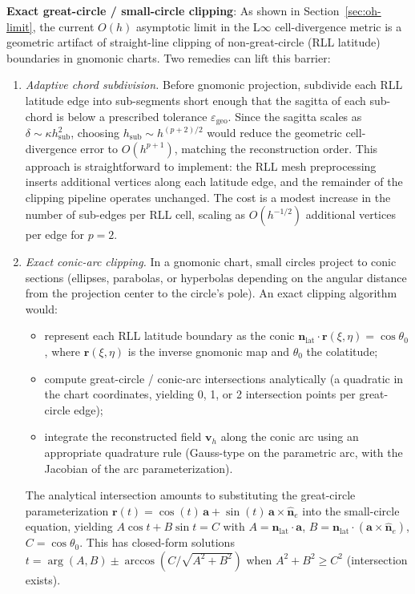 \documentclass[11pt]{article}
\begin{document}
\begin{itemize}
    \textbf{Exact great-circle / small-circle clipping}:
    As shown in Section~\ref{sec:oh-limit}, the current \(O(h)\) asymptotic
    limit in the L\(\infty\) cell-divergence metric is a geometric artifact of
    straight-line clipping of non-great-circle (RLL latitude) boundaries in
    gnomonic charts.  Two remedies can lift this barrier:
    \begin{enumerate}
      \item \emph{Adaptive chord subdivision.}  Before gnomonic projection,
      subdivide each RLL latitude edge into sub-segments short enough that the
      sagitta of each sub-chord is below a prescribed tolerance
      \(\varepsilon_{\mathrm{geo}}\).  Since the sagitta scales as
      \(\delta \sim \kappa h_{\mathrm{sub}}^2\), choosing
      \(h_{\mathrm{sub}} \sim h^{(p+2)/2}\) would reduce the geometric
      cell-divergence error to \(O(h^{p+1})\), matching the reconstruction
      order.  This approach is straightforward to implement: the RLL mesh
      preprocessing inserts additional vertices along each latitude edge, and
      the remainder of the clipping pipeline operates unchanged.  The cost is
      a modest increase in the number of sub-edges per RLL cell, scaling as
      \(O(h^{-1/2})\) additional vertices per edge for \(p=2\).

      \item \emph{Exact conic-arc clipping.}  In a gnomonic chart, small
      circles project to conic sections (ellipses, parabolas, or hyperbolas
      depending on the angular distance from the projection center to the
      circle's pole).  An exact clipping algorithm would:
      \begin{itemize}
        \item represent each RLL latitude boundary as the conic
          \(\mathbf{n}_{\mathrm{lat}} \cdot \mathbf{r}(\xi,\eta) = \cos\theta_0\),
          where \(\mathbf{r}(\xi,\eta)\) is the inverse gnomonic map and
          \(\theta_0\) the colatitude;
        \item compute great-circle / conic-arc intersections analytically
          (a quadratic in the chart coordinates, yielding 0, 1, or 2
          intersection points per great-circle edge);
        \item integrate the reconstructed field \(\mathbf{v}_h\) along the
          conic arc using an appropriate quadrature rule (Gauss-type on the
          parametric arc, with the Jacobian of the arc parameterization).
      \end{itemize}
      The analytical intersection amounts to substituting the great-circle
      parameterization \(\mathbf{r}(t) = \cos(t)\,\mathbf{a} + \sin(t)\,
      \mathbf{a}\times\hat{\mathbf{n}}_e\) into the small-circle equation,
      yielding \(A\cos t + B\sin t = C\) with \(A = \mathbf{n}_{\mathrm{lat}}
      \cdot \mathbf{a}\), \(B = \mathbf{n}_{\mathrm{lat}} \cdot
      (\mathbf{a}\times\hat{\mathbf{n}}_e)\), \(C = \cos\theta_0\).
      This has closed-form solutions \(t = \arg(A,B) \pm \arccos(C/\sqrt{A^2+B^2})\)
      when \(A^2+B^2 \ge C^2\) (intersection exists).


\end{enumerate}
\end{itemize}
\end{document}
